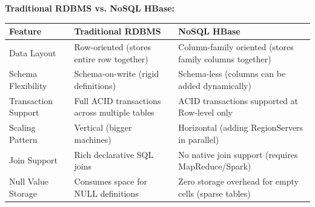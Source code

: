 \documentclass[12pt,a4paper]{article}
\renewcommand{\arraystretch}{1.45}
\begin{document}
\begin{tcolorbox}[tikzbox, title={\textbf{Comparison Snapshot}}]
\textbf{Traditional RDBMS vs. NoSQL HBase:}\par\vspace{6pt}\noindent
{\renewcommand{\arraystretch}{1.4}%
\begin{tabularx}{\linewidth}{|B{3.2cm}|Y|Y|}
\hline
\textbf{Feature} & \textbf{Traditional RDBMS} & \textbf{NoSQL HBase} \\
\hline
Data Layout & Row-oriented (stores entire row together) & Column-family oriented (stores family columns together) \\
\hline
Schema Flexibility & Schema-on-write (rigid definitions) & Schema-less (columns can be added dynamically) \\
\hline
Transaction Support & Full ACID transactions across multiple tables & ACID transactions supported at Row-level only \\
\hline
Scaling Pattern & Vertical (bigger machines) & Horizontal (adding RegionServers in parallel) \\
\hline
Join Support & Rich declarative SQL joins & No native join support (requires MapReduce/Spark) \\
\hline
Null Value Storage & Consumes space for NULL definitions & Zero storage overhead for empty cells (sparse tables) \\
\hline
\end{tabularx}}
\end{tcolorbox}
\end{document}
